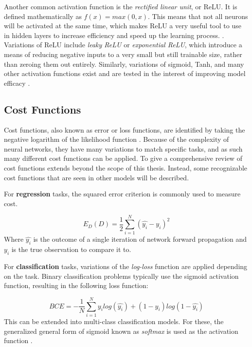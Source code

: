 Another common activation function is the \textit{rectified linear unit}, or ReLU.  It is defined mathematically as $f(x) = max(0,x)$.  This means that not all neurons will be activated at the same time, which makes ReLU a very useful tool to use in hidden layers to increase efficiency and speed up the learning process. \cite{Goodfellow-et-al-2016} \cite{sharma2017activation}. 
 Variations of ReLU include \textit{leaky ReLU} or \textit{exponential ReLU}, which introduce a means of reducing negative inputs to a very small but still trainable size, rather than zeroing them out entirely.  Similarly, variations of sigmoid, Tanh, and many other activation functions exist and are tested in the interest of improving model efficacy \cite{banerjee2019empirical}.






\hypertarget{cost-functions}{%
\subsection{Cost Functions}\label{cost-functions}}

Cost functions, also known as error or loss functions, are identified by taking the negative logarithm of the likelihood function \cite{bishop2006pattern}.  Because of the complexity of neural networks, they have many variations to match specific tasks, and as such many different cost functions can be applied.  To give a comprehensive review of cost functions extends beyond the scope of this thesis.  Instead, some recognizable cost functions that are seen in other models will be described.

For \textbf{regression} tasks, the squared error criterion is commonly used to measure cost.

\[
E_D(D) = \frac{1}{2} \sum_{i=1}^N (\hat{y_i} - y_i)^2
\] Where $\hat{y_i}$ is the outcome of a single iteration of network forward
propagation and \(y_i\) is the true observation to compare it to.

For \textbf{classification} tasks, variations of the \textit{log-loss} function are applied depending on the task.  Binary classification problems typically use the sigmoid activation function, resulting in the following loss function:


$$
BCE = - \frac{1}{N} \sum_{i=1}^N y_i log (\hat{y_i}) + (1-y_i) log(1-\hat{y_i})
$$
This can be extended into multi-class classification models.  For these, the generalized general form of sigmoid known as \textit{softmax} is used as the activation function \cite{bishop2006pattern}.  

